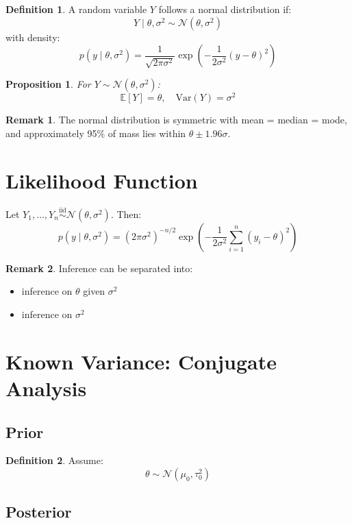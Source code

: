 \documentclass[12pt,oneside]{book}
\numberwithin{equation}{section}
\theoremstyle{definition}
\newtheorem{definition}{Definition}[section]
\newtheorem{remark}{Remark}[section]
\theoremstyle{plain}
\newtheorem{proposition}{Proposition}[section]
\theoremstyle{remark}
\newcommand{\E}{\mathbb{E}}
\newcommand{\Var}{\mathrm{Var}}
\newcommand{\iid}{\overset{\text{iid}}{\sim}}
\newcommand{\Normal}{\mathcal{N}}
\begin{document}
\begin{definition}
A random variable $Y$ follows a normal distribution if:
$$
Y \mid \theta, \sigma^2 \sim \Normal(\theta, \sigma^2)
$$
with density:
$$
p(y \mid \theta, \sigma^2)
=
\frac{1}{\sqrt{2\pi \sigma^2}}
\exp\left(-\frac{1}{2\sigma^2}(y - \theta)^2\right)
$$
\end{definition}

\begin{proposition}
For $Y \sim \Normal(\theta, \sigma^2)$:
$$
\E[Y] = \theta, \quad \Var(Y) = \sigma^2
$$
\end{proposition}

\begin{remark}
The normal distribution is symmetric with mean = median = mode, and approximately 95\% of mass lies within $\theta \pm 1.96\sigma$.
\end{remark}

\section{Likelihood Function}

Let $Y_1,\dots,Y_n \iid \Normal(\theta, \sigma^2)$. Then:
$$
p(y \mid \theta, \sigma^2)
=
(2\pi\sigma^2)^{-n/2}
\exp\left(
-\frac{1}{2\sigma^2}\sum_{i=1}^n (y_i - \theta)^2
\right)
$$

\begin{remark}
Inference can be separated into:
\begin{itemize}
\item inference on $\theta$ given $\sigma^2$
\item inference on $\sigma^2$
\end{itemize}
\end{remark}

\section{Known Variance: Conjugate Analysis}

\subsection{Prior}

\begin{definition}
Assume:
$$
\theta \sim \Normal(\mu_0, \tau_0^2)
$$
\end{definition}

\subsection{Posterior}
\end{document}

